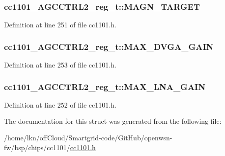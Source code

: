 \subsubsection[{\texorpdfstring{M\+A\+G\+N\+\_\+\+T\+A\+R\+G\+ET}{MAGN_TARGET}}]{ cc1101\+\_\+\+A\+G\+C\+C\+T\+R\+L2\+\_\+reg\+\_\+t\+::\+M\+A\+G\+N\+\_\+\+T\+A\+R\+G\+ET}\hypertarget{structcc1101___a_g_c_c_t_r_l2__reg__t_a9c71a265117aaac703e06b308cf158b4}{}\label{structcc1101___a_g_c_c_t_r_l2__reg__t_a9c71a265117aaac703e06b308cf158b4}


Definition at line 251 of file cc1101.\+h.

\subsubsection[{\texorpdfstring{M\+A\+X\+\_\+\+D\+V\+G\+A\+\_\+\+G\+A\+IN}{MAX_DVGA_GAIN}}]{ cc1101\+\_\+\+A\+G\+C\+C\+T\+R\+L2\+\_\+reg\+\_\+t\+::\+M\+A\+X\+\_\+\+D\+V\+G\+A\+\_\+\+G\+A\+IN}\hypertarget{structcc1101___a_g_c_c_t_r_l2__reg__t_ac19392f07c9e32828f204837e3477ad9}{}\label{structcc1101___a_g_c_c_t_r_l2__reg__t_ac19392f07c9e32828f204837e3477ad9}


Definition at line 253 of file cc1101.\+h.

\subsubsection[{\texorpdfstring{M\+A\+X\+\_\+\+L\+N\+A\+\_\+\+G\+A\+IN}{MAX_LNA_GAIN}}]{ cc1101\+\_\+\+A\+G\+C\+C\+T\+R\+L2\+\_\+reg\+\_\+t\+::\+M\+A\+X\+\_\+\+L\+N\+A\+\_\+\+G\+A\+IN}\hypertarget{structcc1101___a_g_c_c_t_r_l2__reg__t_a07cb4220a1ecbb87cf305ad33a60f116}{}\label{structcc1101___a_g_c_c_t_r_l2__reg__t_a07cb4220a1ecbb87cf305ad33a60f116}


Definition at line 252 of file cc1101.\+h.



The documentation for this struct was generated from the following file\+:\begin{DoxyCompactItemize}
\item 
/home/lkn/off\+Cloud/\+Smartgrid-\/code/\+Git\+Hub/openwsn-\/fw/bsp/chips/cc1101/\hyperlink{cc1101_8h}{cc1101.\+h}\end{DoxyCompactItemize}

